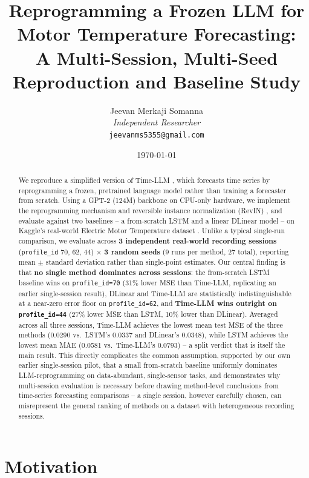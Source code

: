 \documentclass[11pt]{article}
\title{\textbf{Reprogramming a Frozen LLM for Motor Temperature Forecasting:\\
A Multi-Session, Multi-Seed Reproduction and Baseline Study}}
\author{
  Jeevan Merkaji Somanna \\
  \textit{Independent Researcher} \\
  \texttt{jeevanms5355@gmail.com}
}
\date{\today}
\newcommand{\code}[1]{\texttt{#1}}
\begin{document}
\maketitle

\begin{abstract}
We reproduce a simplified version of Time-LLM \citep{jin2023time}, which forecasts
time series by reprogramming a frozen, pretrained language model rather than
training a forecaster from scratch. Using a GPT-2 (124M) backbone
\citep{radford2019gpt2} on CPU-only hardware, we implement the reprogramming
mechanism and reversible instance normalization (RevIN) \citep{kim2022revin}, and
evaluate against two baselines -- a from-scratch LSTM and a linear DLinear model
\citep{zeng2023dlinear} -- on Kaggle's real-world Electric Motor Temperature
dataset \citep{kagglemotor,kirchgassner2021motor}. Unlike a typical single-run
comparison, we evaluate across \textbf{3 independent real-world recording
sessions} (\code{profile\_id} 70, 62, 44) \(\times\) \textbf{3 random seeds}
(9 runs per method, 27 total), reporting mean \(\pm\) standard deviation rather
than single-point estimates. Our central finding is that \textbf{no single
method dominates across sessions}: the from-scratch LSTM baseline wins on
\code{profile\_id=70} (31\% lower MSE than Time-LLM, replicating an earlier
single-session result), DLinear and Time-LLM are statistically indistinguishable
at a near-zero error floor on \code{profile\_id=62}, and \textbf{Time-LLM wins
outright on \code{profile\_id=44}} (27\% lower MSE than LSTM, 10\% lower than
DLinear). Averaged across all three sessions, Time-LLM achieves the lowest mean
test MSE of the three methods (0.0290 vs.\ LSTM's 0.0337 and DLinear's 0.0348),
while LSTM achieves the lowest mean MAE (0.0581 vs.\ Time-LLM's 0.0793) -- a
split verdict that is itself the main result. This directly complicates the
common assumption, supported by our own earlier single-session pilot, that a
small from-scratch baseline uniformly dominates LLM-reprogramming on
data-abundant, single-sensor tasks, and demonstrates why multi-session
evaluation is necessary before drawing method-level conclusions from
time-series forecasting comparisons -- a single session, however carefully
chosen, can misrepresent the general ranking of methods on a dataset with
heterogeneous recording sessions.
\end{abstract}

\section{Motivation}
\end{document}
